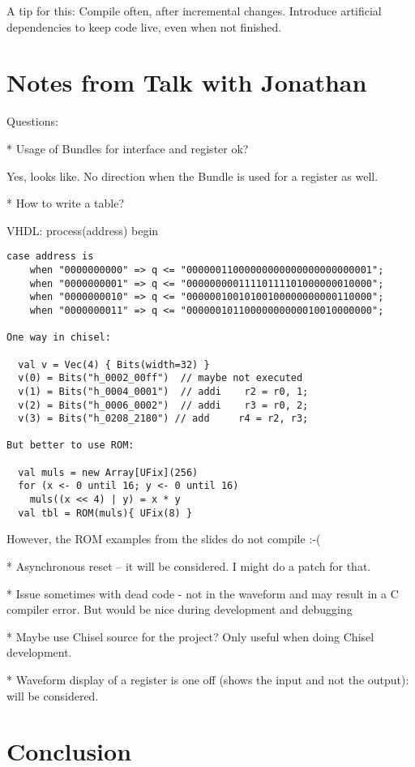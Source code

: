 \documentclass[a4paper, conference]{IEEEtran}
\begin{document}
A tip for this: Compile often, after incremental changes. Introduce artificial
dependencies to keep code live, even when not finished.

\section{Notes from Talk with Jonathan}

Questions:

* Usage of Bundles for interface and register ok?

Yes, looks like. No direction when the Bundle is used for a register as well.

* How to write a table?

VHDL:
process(address) begin

\begin{verbatim}
case address is
    when "0000000000" => q <= "00000011000000000000000000000001";
    when "0000000001" => q <= "00000000011110111101000000010000";
    when "0000000010" => q <= "00000010010100100000000000110000";
    when "0000000011" => q <= "00000010110000000000010010000000";

One way in chisel:

  val v = Vec(4) { Bits(width=32) }
  v(0) = Bits("h_0002_00ff")  // maybe not executed
  v(1) = Bits("h_0004_0001")  // addi    r2 = r0, 1;
  v(2) = Bits("h_0006_0002")  // addi    r3 = r0, 2;
  v(3) = Bits("h_0208_2180") // add     r4 = r2, r3;

But better to use ROM:

  val muls = new Array[UFix](256)
  for (x <- 0 until 16; y <- 0 until 16)
    muls((x << 4) | y) = x * y
  val tbl = ROM(muls){ UFix(8) }

\end{verbatim}

However, the ROM examples from the slides do not compile :-(

* Asynchronous reset -- it will be considered. I might do a patch for that.

* Issue sometimes with dead code - not in the waveform and may
result in a C compiler error. But would be nice during development and debugging

* Maybe use Chisel source for the project? Only useful when doing Chisel development.

* Waveform display of a register is one off (shows the input and not the output):
will be considered.

\section{Conclusion}
\label{sec:conclusion}
\end{document}
